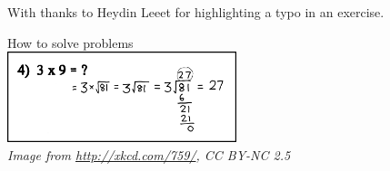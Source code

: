 \documentclass[a4paper,10pt,titlepage]{article}
\theoremstyle{definition}
\begin{document}
\newpage
\nocite{*}
\printbibliography[title=Bibliography and Further Reading, heading=bibnumbered]

With thanks to Heydin Leeet for highlighting a typo in an exercise.

\vspace{\fill}

\begin{center}
  How to solve problems\\
  \includegraphics[width=0.5\textwidth]{3x9}\\
  \small{\textit{Image from \url{http://xkcd.com/759/}, CC BY-NC 2.5}}
\end{center}
\end{document}
